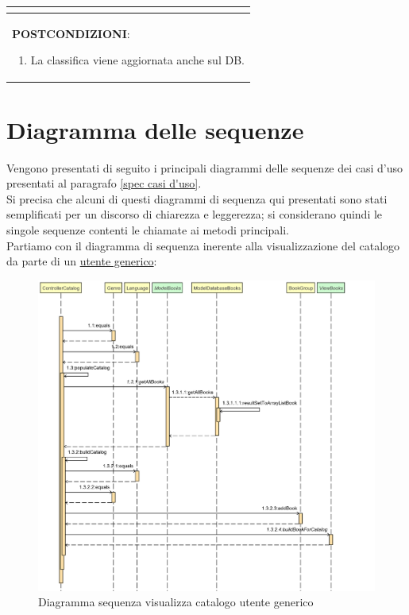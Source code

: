 \documentclass[a4paper,11pt]{report}
\begin{document}
\begin{table}[h!]
\begin{tabularx}{\textwidth}{|X|}
\begin{enumerate}
\begin{enumerate}
\begin{itemize}
            \end{itemize}             
        \end{enumerate}
      \end{enumerate} \\
      \hline
      \textbf{POSTCONDIZIONI}:
      \begin{enumerate}
        \item La classifica viene aggiornata anche sul DB.
      \end{enumerate} \\
      \hline
    \end{tabularx}
  \end{table}
\clearpage


\chapter{Diagramma delle sequenze}
Vengono presentati di seguito i principali diagrammi delle sequenze dei casi d'uso presentati al paragrafo \ref{spec casi d'uso}.\\
Si precisa che alcuni di questi diagrammi di sequenza qui presentati sono stati semplificati per un discorso di chiarezza e leggerezza; si considerano quindi le singole sequenze contenti le chiamate ai metodi principali. \\
\newline
Partiamo con il diagramma di sequenza inerente alla visualizzazione del catalogo da parte di un \underline{utente generico}:
\begin{figure}[h!]
    	\centering
    	\hspace*{-0.4in}
    	\includegraphics[width=1.2\linewidth]{Sequence diagrams/2 Order Creation/ViewCatalog.png}
    	\caption{Diagramma sequenza visualizza catalogo utente generico}
    \end{figure}\\
    
\end{document}
